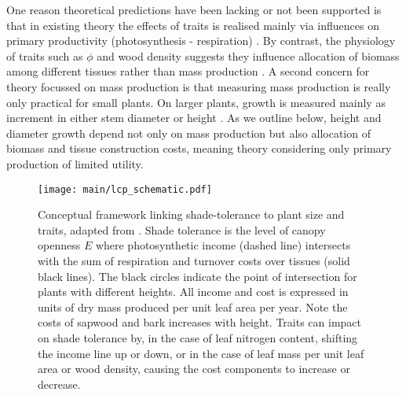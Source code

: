 \documentclass[9pt,twocolumn,twoside]{pnas-new}
\begin{document}
One reason theoretical predictions have been lacking or not been supported is that in existing theory the effects of traits is realised mainly via influences on primary productivity (photosynthesis - respiration) \citep{Wright-2000, Enquist-2007}. By contrast, the physiology of traits such as $\phi$ and wood density suggests they influence allocation of biomass among different tissues rather than mass production \citep{Falster-2011, Duursma-2016, Gibert-2016}. A second concern for theory focussed on mass production is that measuring mass production is really only practical for small plants. On larger plants, growth is measured mainly as increment in either stem diameter or height \citep{Purves-2008, Anderson-2015, Kunstler-2016}. As we outline below, height and diameter growth depend not only on mass production but also allocation of biomass and tissue construction costs, meaning theory considering only primary production of limited utility.

\begin{figure}[!ht]
\centering
\texttt{[image: main/lcp\_schematic.pdf]}
\caption{Conceptual framework linking shade-tolerance to plant size and traits, adapted from \citep{Givnish-1988}. Shade tolerance is the level of canopy openness $E$ where photosynthetic income (dashed line) intersects with the sum of respiration and turnover costs over tissues (solid black lines). The black circles indicate the point of intersection for plants with different heights. All income and cost is expressed in units of dry mass produced  per unit leaf area per year. Note the costs of sapwood and bark increases with height.
Traits can impact on shade tolerance by, in the case of leaf nitrogen content, shifting the income line up or down, or in the case of leaf mass per unit leaf area or wood density, causing the cost components to increase or decrease.
\label{fig:wplcp_idea}}
\end{figure}
\end{document}
